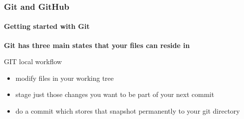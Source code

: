 \begin{frame}
    \frametitle{Git and GitHub}
    \framesubtitle{Getting started with Git}
    \addtocounter{nframe}{1}
    
    \textbf{Git has three main states that your files can reside in}

    \begin{block}{GIT local workflow}
       \begin{itemize}
           \item modify files in your working tree
           \item stage just those changes you want to be part of your next commit 
           \item do a commit which stores that snapshot permanently to your git directory
       \end{itemize}
    
    \end{block}

\end{frame}
